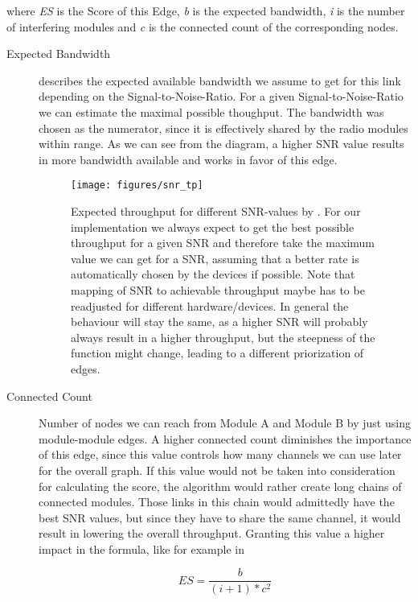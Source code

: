       where \textit{ES} is the Score of this Edge, \textit{b} is the expected bandwidth, \textit{i} is the number of 
      interfering modules and \textit{c} is the connected count of the corresponding nodes.
      
      \begin{description}
	\item[Expected Bandwidth]
	  describes the expected available bandwidth we assume to get for this link depending on the Signal-to-Noise-Ratio.
	  For a given Signal-to-Noise-Ratio we can estimate the maximal possible thoughput.
	  The bandwidth was chosen as the numerator, since it is effectively shared by the radio modules within range.
	  As we can see from the diagram, a higher SNR value results in more bandwidth available and works in favor of this edge.
	  
	  \begin{figure}[h]
	    \centering
	    \texttt{[image: figures/snr\_tp]}
	    \caption{Expected throughput for different \ac{SNR}-values by \cite{expected_snr}. For our implementation we always expect to get the best possible
	    throughput for a given SNR and therefore take the maximum value we can get for a SNR, assuming that a better rate is automatically chosen by the devices if possible.
	    Note that mapping of SNR to achievable throughput maybe has to be readjusted for different hardware/devices. In general the behaviour will stay the same, as 
	    a higher SNR will probably always result in a higher throughput, but the steepness of the function might change, leading to a different priorization of edges.}
	    \label{fig:snr_tp}
	  \end{figure}
	
	\item[Connected Count]
	  Number of nodes we can reach from Module A and Module B by just using module-module edges. 
	  A higher connected count diminishes the importance of this edge, since this value controls how many channels we can use later for the overall graph.
	  If this value would not be taken into consideration for calculating the score, the algorithm would rather create long chains of connected modules. 
	  Those links in this chain would admittedly have the best SNR values, but since they have to share the same channel, it would result in lowering the overall throughput.
	  Granting this value a higher impact in the formula, like for example in 
	  
	  \begin{equation}
	    ES=\frac{b}{(i + 1)* c^2}
	  \end{equation}
	  

\end{description}
